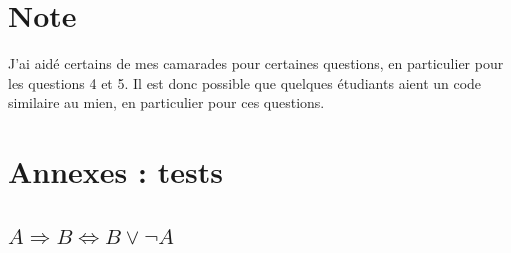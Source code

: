 \documentclass[a4paper,11pt]{article}
\begin{document}
\bigskip
\bigskip

\section*{Note}
J'ai aidé certains de mes camarades pour certaines questions, en particulier pour les questions 4 et 5. Il est donc possible que quelques étudiants aient un code similaire au mien, en particulier pour ces questions.


\pagebreak
\section*{Annexes : tests}

\subsection*{$A \Rightarrow B \Leftrightarrow B \lor \lnot A$}
\end{document}
